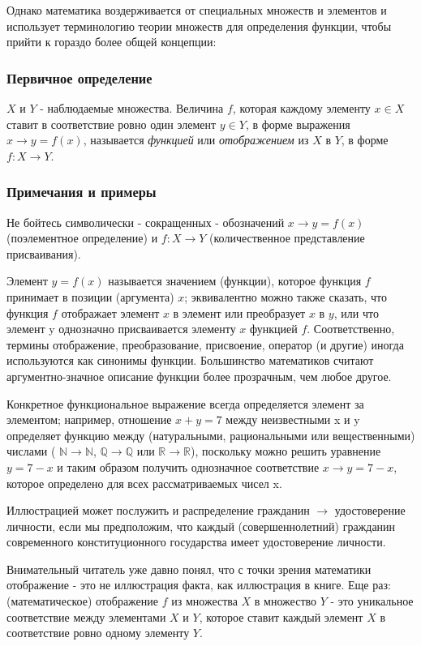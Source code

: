 Однако математика воздерживается от специальных множеств и элементов и использует терминологию теории множеств для определения функции, чтобы прийти к гораздо более общей концепции:

\subsubsection{Первичное определение}
\(X\) и \(Y\) - наблюдаемые множества.
Величина \(f\), которая каждому элементу \(x \in X\) ставит в соответствие ровно один элемент \(y \in Y\), в форме выражения \(x \rightarrow y = f(x)\), называется \textit{функцией} или \textit{отображением} из \(X\) в \(Y\), в форме \(f:X \rightarrow Y\).

\subsubsection{Примечания и примеры}
Не бойтесь символически - сокращенных - обозначений \(x \rightarrow y =f(x)\) (поэлементное определение) и \(f: X \rightarrow Y\) (количественное представление присваивания).

Элемент \(y = f(x)\) называется значением (функции), которое функция \(f\) принимает в позиции (аргумента) \(x\); эквивалентно можно также сказать, что функция \(f\) отображает элемент  \(x\) в элемент или преобразует \(x\) в \(y\), или что элемент y однозначно присваивается элементу \(x\) функцией \(f\).
Соответственно, термины отображение, преобразование, присвоение, оператор (и другие) иногда используются как синонимы функции.
Большинство математиков считают аргументно-значное описание функции более прозрачным, чем любое другое.

Конкретное функциональное выражение всегда определяется элемент за элементом;
например, отношение \(x+y=7\) между неизвестными x и y определяет функцию между (натуральными, рациональными или вещественными) числами ( \(\mathbb{N} \rightarrow \mathbb{N}\), \(\mathbb{Q} \rightarrow \mathbb{Q}\) или \(\mathbb{R} \rightarrow \mathbb{R}\)), поскольку можно решить уравнение \(y=7-x\) и таким образом получить однозначное соответствие \(x \rightarrow y = 7-x\), которое определено для всех рассматриваемых чисел x.

Иллюстрацией может послужить и распределение гражданин \(\rightarrow\) удостоверение личности, если мы предположим, что каждый (совершеннолетний) гражданин современного конституционного государства имеет удостоверение личности.

Внимательный читатель уже давно понял, что с точки зрения математики отображение - это не иллюстрация факта, как иллюстрация в книге. Еще раз: (математическое) отображение \(f\) из множества \(X\) в множество \(Y\) - это уникальное соответствие между элементами \(X\) и \(Y\), которое ставит каждый элемент \(X\) в соответствие ровно одному элементу \(Y\).

